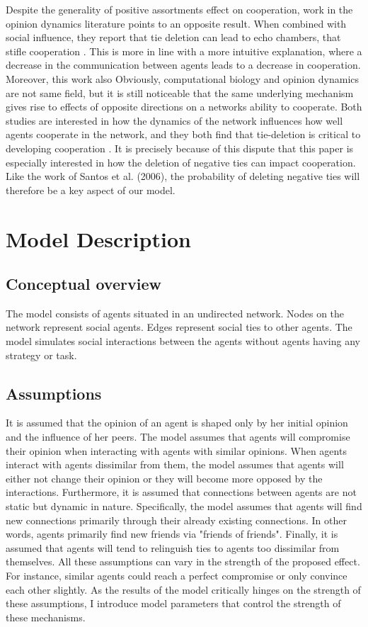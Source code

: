 \documentclass{article}
\begin{document}
Despite the generality of positive assortments effect on cooperation, work in the opinion dynamics literature points to an opposite result. When combined with social influence, they report that tie deletion can lead to echo chambers, that stifle cooperation \cite{sasahara_social_2021}. This is more in line with a more intuitive explanation, where a decrease in the communication between agents leads to a decrease in cooperation. Moreover, this work also Obviously, computational biology and opinion dynamics are not same field, but it is still noticeable that the same underlying mechanism gives rise to effects of opposite directions on a networks ability to cooperate. Both studies are interested in how the dynamics of the network influences how well agents cooperate in the network, and they both find that tie-deletion is critical to developing cooperation \cite{santos_cooperation_2006,sasahara_social_2021}. It is precisely because of this dispute that this paper is especially interested in how the deletion of negative ties can impact cooperation. Like the work of Santos et al. (2006), the probability of deleting negative ties will therefore be a key aspect of our model.  


\section{Model Description}
\subsection{Conceptual overview}
The model consists of agents situated in an undirected network. Nodes on the network represent social agents. Edges represent social ties to other agents. 
The model simulates social interactions between the agents without agents having any strategy or task. 

\subsection{Assumptions}
It is assumed that the opinion of an agent is shaped only by her initial opinion and the influence of her peers. 
The model assumes that agents will compromise their opinion when interacting with agents with similar opinions. 
When agents interact with agents dissimilar from them, the model assumes that agents will either not change their opinion or they will become more opposed by the interactions.
Furthermore, it is assumed that connections between agents are not static but dynamic in nature. 
Specifically, the model assumes that agents will find new connections primarily through their already existing connections. In other words, 
agents primarily find new friends via "friends of friends". Finally, it is assumed that agents will tend to relinguish ties to agents too dissimilar from themselves.
All these assumptions can vary in the strength of the proposed effect. For instance, similar agents could reach a perfect compromise or only convince each other slightly. 
As the results of the model critically hinges on the strength of these assumptions, I introduce model parameters that control the strength of these mechanisms.
\end{document}
